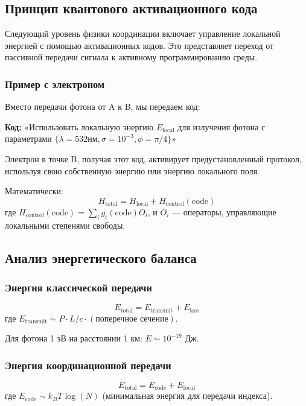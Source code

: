 \documentclass[11pt,a4paper]{article}
\begin{document}
	\subsection{Принцип квантового активационного кода}
	
	Следующий уровень физики координации включает управление локальной энергией с помощью активационных кодов. Это представляет переход от пассивной передачи сигнала к активному программированию среды.
	
	\subsubsection{Пример с электроном}
	Вместо передачи фотона от A к B, мы передаем код:
	
	\textbf{Код:} «Использовать локальную энергию $E_{\text{local}}$ для излучения фотона с параметрами $\{\lambda=532\text{нм}, \sigma=10^{-3}, \phi=\pi/4\}$»
	
	Электрон в точке B, получая этот код, активирует предустановленный протокол, используя свою собственную энергию или энергию локального поля.
	
	Математически:
	\begin{equation}
		H_{\text{total}} = H_{\text{local}} + H_{\text{control}}(\text{code})
	\end{equation}
	где $H_{\text{control}}(\text{code}) = \sum_i g_i(\text{code}) O_i$, и $O_i$ — операторы, управляющие локальными степенями свободы.
	
	\subsection{Анализ энергетического баланса}
	
	\subsubsection{Энергия классической передачи}
	\begin{equation}
		E_{\text{total}} = E_{\text{transmit}} + E_{\text{loss}}
	\end{equation}
	где $E_{\text{transmit}} \sim P \cdot L/c \cdot (\text{поперечное сечение})$.
	
	Для фотона 1 эВ на расстоянии 1 км: $E \sim 10^{-19}$ Дж.
	
	\subsubsection{Энергия координационной передачи}
	\begin{equation}
		E_{\text{total}} = E_{\text{code}} + E_{\text{local}}
	\end{equation}
	где $E_{\text{code}} \sim k_B T \log(N)$ (минимальная энергия для передачи индекса).
	
\end{document}
